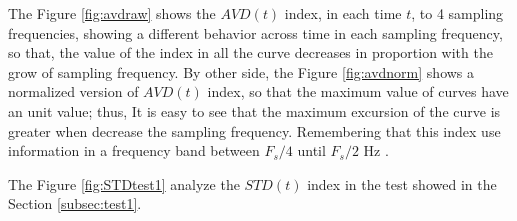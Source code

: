 \documentclass[review]{elsarticle}
\begin{document}
The Figure \ref{fig:avdraw} shows the $AVD(t)$ index, in each time $t$, 
to 4 sampling frequencies, showing a different behavior across time in each sampling frequency,
so that, the value of the index in all  the curve decreases in proportion with 
the grow of sampling frequency. By other side,
the Figure \ref{fig:avdnorm} shows a normalized version of $AVD(t)$ index, 
so that the maximum value of curves have an unit value; thus,
It is easy to see that the maximum excursion of the curve is greater when decrease
the sampling frequency. Remembering that this index use information in a frequency
band between $F_s/4$ until $F_s/2$ Hz \cite{rivera2017selection}.

The Figure \ref{fig:STDtest1} analyze the $STD(t)$ index in the test showed in the 
Section \ref{subsec:test1}.
\end{document}

